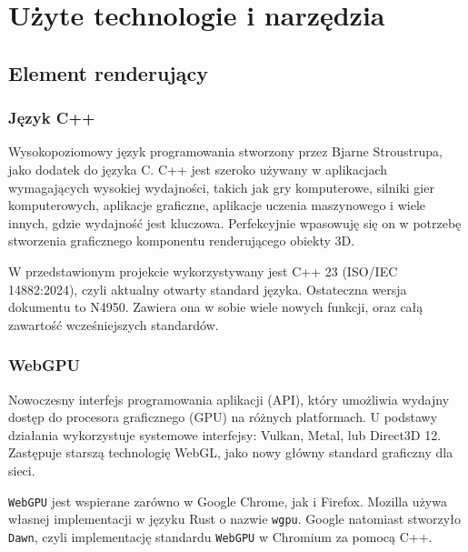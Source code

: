 \section{Użyte technologie i narzędzia}

\subsection{Element renderujący}

  \subsubsection{Język C++}
  Wysokopoziomowy język programowania stworzony przez Bjarne Stroustrupa, jako dodatek do języka C. C++ jest szeroko używany w aplikacjach wymagających wysokiej wydajności, takich jak gry komputerowe, silniki gier komputerowych, aplikacje graficzne, aplikacje uczenia maszynowego i wiele innych, gdzie wydajność jest kluczowa. Perfekcyjnie wpasowuję się on w potrzebę stworzenia graficznego komponentu renderującego obiekty 3D.

  W przedstawionym projekcie wykorzystywany jest C++ 23 (ISO/IEC 14882:2024), czyli aktualny otwarty standard języka. Ostateczna wersja dokumentu to N4950. Zawiera ona w sobie wiele nowych funkcji, oraz całą zawartość wcześniejszych standardów. 

  \subsubsection{WebGPU}
  Nowoczesny interfejs programowania aplikacji (API), który umożliwia wydajny dostęp do procesora graficznego (GPU) na różnych platformach. U podstawy działania wykorzystuje systemowe interfejsy: Vulkan, Metal, lub Direct3D 12. Zastępuje starszą technologię WebGL, jako nowy główny standard graficzny dla sieci.

  \begin{komentarz}
  \texttt{WebGPU} jest wspierane zarówno w Google Chrome, jak i Firefox. Mozilla używa własnej implementacji w języku Rust o nazwie \texttt{wgpu}. Google natomiast stworzyło \texttt{Dawn}, czyli implementację standardu \texttt{WebGPU} w Chromium za pomocą C++. 
  \end{komentarz}
 
